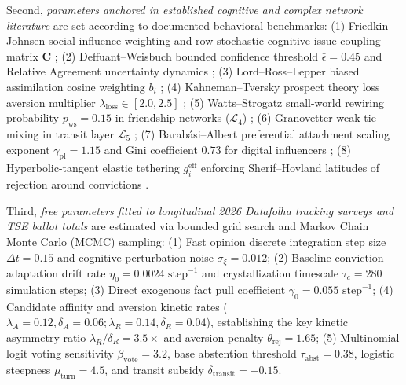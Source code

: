 \documentclass[11pt,a4paper]{article}
\begin{document}
Second, \emph{parameters anchored in established cognitive and complex network literature} are set according to documented behavioral benchmarks:
(1) Friedkin--Johnsen social influence weighting and row-stochastic cognitive issue coupling matrix $\mathbf{C}$ \citep{friedkin1990social, friedkin2016network};
(2) Deffuant--Weisbuch bounded confidence threshold $\bar{\epsilon} = 0.45$ and Relative Agreement uncertainty dynamics \citep{deffuant2000mixing, deffuant2002how};
(3) Lord--Ross--Lepper biased assimilation cosine weighting $b_i$ \citep{lord1979biased, dandekar2013biased};
(4) Kahneman--Tversky prospect theory loss aversion multiplier $\lambda_{\mathrm{loss}} \in [2.0, 2.5]$ \citep{kahneman1979prospect};
(5) Watts--Strogatz small-world rewiring probability $p_{\mathrm{ws}} = 0.15$ in friendship networks ($\mathcal{L}_4$) \citep{watts1998collective};
(6) Granovetter weak-tie mixing in transit layer $\mathcal{L}_5$ \citep{granovetter1973strength};
(7) Barab\'asi--Albert preferential attachment scaling exponent $\gamma_{\mathrm{pl}} = 1.15$ and Gini coefficient $0.73$ for digital influencers \citep{barabasi1999emergence, bianconi2001competition};
(8) Hyperbolic-tangent elastic tethering $g_i^{\mathrm{eff}}$ enforcing Sherif--Hovland latitudes of rejection around convictions \citep{sherif1961social, howe2017attitude}.

Third, \emph{free parameters fitted to longitudinal 2026 Datafolha tracking surveys and TSE ballot totals} are estimated via bounded grid search and Markov Chain Monte Carlo (MCMC) sampling:
(1) Fast opinion discrete integration step size $\Delta t = 0.15$ and cognitive perturbation noise $\sigma_{\xi} = 0.012$;
(2) Baseline conviction adaptation drift rate $\eta_0 = 0.0024 \text{ step}^{-1}$ and crystallization timescale $\tau_c = 280$ simulation steps;
(3) Direct exogenous fact pull coefficient $\gamma_0 = 0.055 \text{ step}^{-1}$;
(4) Candidate affinity and aversion kinetic rates ($\lambda_A = 0.12, \delta_A = 0.06; \lambda_R = 0.14, \delta_R = 0.04$), establishing the key kinetic asymmetry ratio $\lambda_R / \delta_R = 3.5\times$ and aversion penalty $\theta_{\mathrm{rej}} = 1.65$;
(5) Multinomial logit voting sensitivity $\beta_{\mathrm{vote}} = 3.2$, base abstention threshold $\tau_{\mathrm{abst}} = 0.38$, logistic steepness $\mu_{\mathrm{turn}} = 4.5$, and transit subsidy $\delta_{\mathrm{transit}} = -0.15$.
\end{document}
